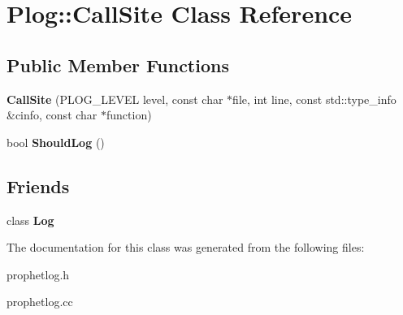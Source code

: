 \hypertarget{classPlog_1_1CallSite}{
\section{Plog::CallSite Class Reference}
\label{classPlog_1_1CallSite}
}
\subsection*{Public Member Functions}
\begin{DoxyCompactItemize}
\item 
\hypertarget{classPlog_1_1CallSite_adb4897abb7bfcfbe449c7911e3169eca}{
{\bfseries CallSite} (PLOG\_\-LEVEL level, const char $\ast$file, int line, const std::type\_\-info \&cinfo, const char $\ast$function)}
\label{classPlog_1_1CallSite_adb4897abb7bfcfbe449c7911e3169eca}

\item 
\hypertarget{classPlog_1_1CallSite_a91be4c31550e6df469706140354678a3}{
bool {\bfseries ShouldLog} ()}
\label{classPlog_1_1CallSite_a91be4c31550e6df469706140354678a3}

\end{DoxyCompactItemize}
\subsection*{Friends}
\begin{DoxyCompactItemize}
\item 
\hypertarget{classPlog_1_1CallSite_acd1b2a0733103b7bbeb76b467ea85446}{
class {\bfseries Log}}
\label{classPlog_1_1CallSite_acd1b2a0733103b7bbeb76b467ea85446}

\end{DoxyCompactItemize}


The documentation for this class was generated from the following files:\begin{DoxyCompactItemize}
\item 
prophetlog.h\item 
prophetlog.cc\end{DoxyCompactItemize}
